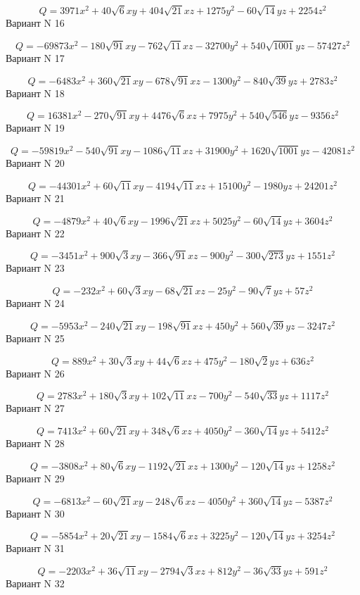 \documentclass[11pt]{report}
\begin{document}
$$Q = 3971 x^{2} + 40 \sqrt{6} x y + 404 \sqrt{21} x z + 1275 y^{2} - 60 \sqrt{14} y z + 2254 z^{2}$$Вариант N 16

$$Q = - 69873 x^{2} - 180 \sqrt{91} x y - 762 \sqrt{11} x z - 32700 y^{2} + 540 \sqrt{1001} y z - 57427 z^{2}$$Вариант N 17

$$Q = - 6483 x^{2} + 360 \sqrt{21} x y - 678 \sqrt{91} x z - 1300 y^{2} - 840 \sqrt{39} y z + 2783 z^{2}$$Вариант N 18

$$Q = 16381 x^{2} - 270 \sqrt{91} x y + 4476 \sqrt{6} x z + 7975 y^{2} + 540 \sqrt{546} y z - 9356 z^{2}$$Вариант N 19

$$Q = - 59819 x^{2} - 540 \sqrt{91} x y - 1086 \sqrt{11} x z + 31900 y^{2} + 1620 \sqrt{1001} y z - 42081 z^{2}$$Вариант N 20

$$Q = - 44301 x^{2} + 60 \sqrt{11} x y - 4194 \sqrt{11} x z + 15100 y^{2} - 1980 y z + 24201 z^{2}$$Вариант N 21

$$Q = - 4879 x^{2} + 40 \sqrt{6} x y - 1996 \sqrt{21} x z + 5025 y^{2} - 60 \sqrt{14} y z + 3604 z^{2}$$Вариант N 22

$$Q = - 3451 x^{2} + 900 \sqrt{3} x y - 366 \sqrt{91} x z - 900 y^{2} - 300 \sqrt{273} y z + 1551 z^{2}$$Вариант N 23

$$Q = - 232 x^{2} + 60 \sqrt{3} x y - 68 \sqrt{21} x z - 25 y^{2} - 90 \sqrt{7} y z + 57 z^{2}$$Вариант N 24

$$Q = - 5953 x^{2} - 240 \sqrt{21} x y - 198 \sqrt{91} x z + 450 y^{2} + 560 \sqrt{39} y z - 3247 z^{2}$$Вариант N 25

$$Q = 889 x^{2} + 30 \sqrt{3} x y + 44 \sqrt{6} x z + 475 y^{2} - 180 \sqrt{2} y z + 636 z^{2}$$Вариант N 26

$$Q = 2783 x^{2} + 180 \sqrt{3} x y + 102 \sqrt{11} x z - 700 y^{2} - 540 \sqrt{33} y z + 1117 z^{2}$$Вариант N 27

$$Q = 7413 x^{2} + 60 \sqrt{21} x y + 348 \sqrt{6} x z + 4050 y^{2} - 360 \sqrt{14} y z + 5412 z^{2}$$Вариант N 28

$$Q = - 3808 x^{2} + 80 \sqrt{6} x y - 1192 \sqrt{21} x z + 1300 y^{2} - 120 \sqrt{14} y z + 1258 z^{2}$$Вариант N 29

$$Q = - 6813 x^{2} - 60 \sqrt{21} x y - 248 \sqrt{6} x z - 4050 y^{2} + 360 \sqrt{14} y z - 5387 z^{2}$$Вариант N 30

$$Q = - 5854 x^{2} + 20 \sqrt{21} x y - 1584 \sqrt{6} x z + 3225 y^{2} - 120 \sqrt{14} y z + 3254 z^{2}$$Вариант N 31

$$Q = - 2203 x^{2} + 36 \sqrt{11} x y - 2794 \sqrt{3} x z + 812 y^{2} - 36 \sqrt{33} y z + 591 z^{2}$$Вариант N 32
\end{document}
